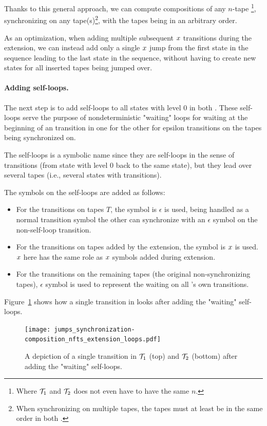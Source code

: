 Thanks to this general approach, we can compute compositions of any $n$-tape \nfts\footnote{Where $\mathcal{T}_1$ and $\mathcal{T}_2$ does not even have to have the same $n$.}, synchronizing on any tape(s)\footnote{When synchronizing on multiple tapes, the tapes must at least be in the same order in both \nfts.}, with the tapes being in an arbitrary order.

As an optimization, when adding multiple subsequent $x$ transitions during the extension, we can instead add only a single $x$ jump from the first state in the sequence leading to the last state in the sequence, without having to create new states for all inserted tapes being jumped over.

\paragraph{Adding self-loops.}
The next step is to add self-loops to all states with level $0$ in both \nfts.
These self-loops serve the purpose of nondeterministic "waiting" loops for waiting at the beginning of an \nft transition in one \nft for the other \nft for epsilon transitions on the tapes being synchronized on.

The self-loops is a symbolic name since they are self-loops in the sense of \nft transitions (from state with level $0$ back to the same state), but they lead over several tapes (i.e., several states with transitions).

The symbols on the self-loops are added as follows:
\begin{itemize}
  \item For the transitions on tapes $T$, the symbol is $\epsilon$ is used, being handled as a normal transition symbol the other \nft can synchronize with an $\epsilon$ symbol on the non-self-loop transition.
  \item For the transitions on tapes added by the extension, the symbol is $x$ is used.
  $x$ here has the same role as $x$ symbols added during extension.
  \item For the transitions on the remaining tapes (the original non-synchronizing tapes), $\epsilon$ symbol is used to represent the waiting on all \nft's own transitions.
\end{itemize}

\begin{example}
  Figure~\ref{fig:composition_nfts_extension_loops} shows how a single transition in \nfts looks after adding the "waiting" self-loops.
  \begin{figure}[ht]
    \centering
    \texttt{[image: jumps\_synchronization-composition\_nfts\_extension\_loops.pdf]}
    \caption{
      A depiction of a single transition in \nfts $\mathcal{T}_1$ (top) and $\mathcal{T}_2$ (bottom) after adding the "waiting" self-loops.
    }
    \label{fig:composition_nfts_extension_loops}
  \end{figure}
\end{example}

